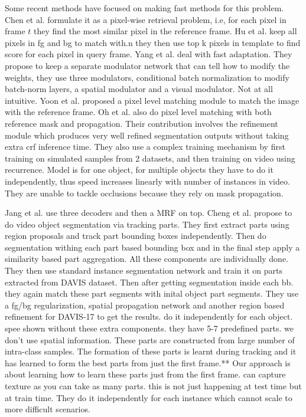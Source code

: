 \documentclass[10pt,twocolumn,letterpaper]{article}
\begin{document}
Some recent methods have focused on making fast methods for this problem. Chen et al. \cite{Chen_2018_CVPR} formulate it as a pixel-wise retrieval problem, i.e, for each pixel in frame $t$ they find the most similar pixel in the reference frame.
Hu et al. \cite{Hu_2018_ECCV} keep all pixels in fg and bg to match with.n they then use top k pixels in template to find score for each pixel in query frame.
Yang et al. \cite{Yang_2018_CVPR} deal with fast adaptation. They propose to keep a separate modulator network that can tell how to modify the weights, they use three modulators, conditional batch normalization to modify batch-norm layers, a spatial modulator and a visual modulator. Not at all intuitive.
Yoon et al. \cite{Yoon_2017_ICCV} proposed a pixel level matching module to match the image with the reference frame. Oh et al. \cite{Oh_2018_CVPR} also do pixel level matching with both reference mask and propagation. Their contribution involves the refinement module which produces very well refined segmentation outputs without taking extra crf inference time. They also use a complex training mechanism by first training on simulated samples from 2 datasets, and then training on video using recurrence. 
Model is for one object, for multiple objects they have to do it independently, thus speed increases linearly with number of instances in video.
They are unable to tackle occlusions because they rely on mask propagation.

Jang et al. \cite{Jang_2017_CVPR} use three decoders and then a MRF on top.
Cheng et al. \cite{Cheng_2018_CVPR} propose to do video object segmentation via tracking parts. They first extract parts using region proposals and track part bounding boxes independently. Then do segmentation withing each part based bounding box and in the final step apply a similarity based part aggregation.
All these components are individually done.
They then use standard instance segmentation network and train it on parts extracted from DAVIS dataset. Then after getting segmentation inside each bb. they again match these part segments with inital object part segments.
They use a fg/bg regularization, spatial propagation network and another region based refinement for DAVIS-17 to get the results. do it independently for each object.
spee shown without these extra components.
they have 5-7 predefined parts. we don't use spatial information. These parts are constructed from large number of intra-class samples.
The formation of these parts is learnt during tracking and it has learned to form the best parts from just the first frame.** Our approach is about learning how to learn these parts just from the first frame.
can capture texture as you can take as many parts.
this is not just happening at test time but at train time.
They do it independently for each instance which cannot scale to more difficult scenarios.
\end{document}
